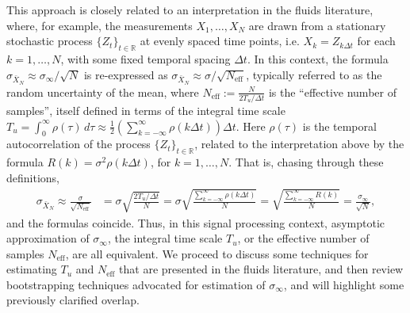 \documentclass[onecolumn,12pt]{iopart}
\newcommand{\RR}{\mathbb{R}}
\begin{document}
This approach is closely related to an interpretation in the fluids literature, where, for example, the measurements $X_1,\ldots,X_N$ are drawn from a stationary stochastic process $\{Z_{t}\}_{t\in \RR}$ at evenly spaced time points, i.e. $X_{k} = Z_{k\Delta t}$ for each $k=1,\ldots, N$, with some fixed temporal spacing $\Delta t$.  In this context, the formula $\sigma_{\bar{X}_{N}} \approx \sigma_{\infty}/\sqrt{N}$ is re-expressed as $\sigma_{\bar{X}_{N}} \approx \sigma/\sqrt{N_{\text{eff}}}$, typically referred to as the random uncertainty of the mean, where $N_{\text{eff}}:= \frac{N}{2T_u/\Delta t}$ is the ``effective number of samples'', itself defined in terms of the integral time scale $T_u = \int_{0}^{\infty}\rho(\tau)\,d\tau\approx \frac{1}{2}\left(\sum_{k=-\infty}^{\infty}\rho(k\Delta t)\right)\Delta t$.  Here $\rho(\tau)$ is the temporal autocorrelation of the process $\{Z_{t}\}_{t\in \RR}$, related to the interpretation above by the formula $ R(k) = \sigma^2\rho(k\Delta t)$, for $k=1,\ldots, N$.  That is, chasing through these definitions,
\begin{align*}
\sigma_{\bar{X}_{N}} \approx \frac{\sigma}{\sqrt{N_{\text{eff}}}} &= \sigma \sqrt{\frac{2T_u/\Delta t}{N}} 
= \sigma\sqrt{\frac{\sum_{k=-\infty}^{\infty}\rho(k\Delta t)}{N}} = \sqrt{\frac{\sum_{k=-\infty}^{\infty}R(k)}{N}} 
= \frac{\sigma_{\infty}}{\sqrt{N}}, 
\end{align*}
and the formulas coincide.  Thus, in this signal processing context, asymptotic approximation of $\sigma_{\infty}$, the integral time scale $T_u$, or the effective number of samples $N_{\text{eff}}$, are all equivalent.  We proceed to discuss some techniques for estimating $T_u$ and $N_{\text{eff}}$ that are presented in the fluids literature, and then review bootstrapping techniques advocated for estimation of $\sigma_{\infty}$, and will highlight some previously clarified overlap.
\end{document}
